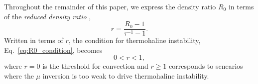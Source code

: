 Throughout the remainder of this paper, we express the density ratio $R_0$ in terms of the \textit{reduced density ratio} \citep{traxler_etal_2011,brown_etal_2013},
\begin{equation} \label{eq:r}
    r = \frac{R_0 - 1}{\tau^{-1} - 1}.
\end{equation}
Written in terms of $r$, the condition for thermohaline instability, Eq.~\eqref{eq:R0_condition}, becomes
\begin{equation} \label{eq:r_condition}
    0 < r < 1,
\end{equation}
where $r = 0$ is the threshold for convection and $r \geq 1$ corresponds to scnearios where the $\mu$ inversion is too weak to drive thermohaline instability.